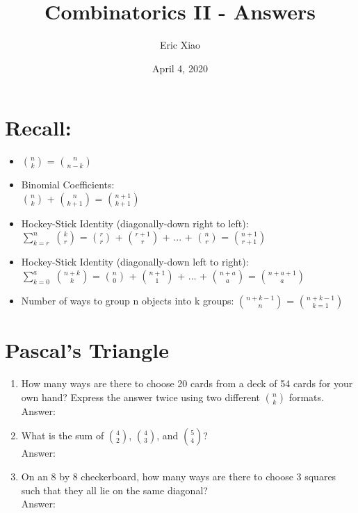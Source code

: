 \documentclass[12pt]{extarticle}
\title{Combinatorics II - Answers}
\author{Eric Xiao}
\date{April 4, 2020}
\begin{document}
\maketitle

\section{Recall:}
\begin{itemize}
    \itemsep 1.0em
    \item {$\binom{n}{k}$ = $\binom{n}{n-k}$}
    \item {Binomial Coefficients:\\$\binom{n}{k}$ + $\binom{n}{k+1}$ = $\binom{n+1}{k+1}$}
    \item {Hockey-Stick Identity (diagonally-down right to left):\\$\displaystyle\sum_{k=r}^{n}$ $\binom{k}{r}$ = $\binom{r}{r}$ + $\binom{r+1}{r}$ + ... + $\binom{n}{r}$ = $\binom{n+1}{r+1}$}
    \item {Hockey-Stick Identity (diagonally-down left to right):\\$\displaystyle\sum_{k=0}^{a}$ $\binom{n+k}{k}$ = $\binom{n}{0}$ + $\binom{n+1}{1}$ + ... + $\binom{n+a}{a}$ = $\binom{n+a+1}{a}$}
    \item {Number of ways to group n objects into k groups: $\binom{n+k-1}{n}$ = $\binom{n+k-1}{k=1}$}
\end{itemize}

\section{Pascal's Triangle}
\begin{enumerate}
    \itemsep 1.5em
    \item {How many ways are there to choose 20 cards from a deck of 54 cards for your own hand? Express the answer twice using two different $\binom{n}{k}$ formats. \\Answer: }
    \item {What is the sum of $\binom{4}{2}$, $\binom{4}{3}$, and $\binom{5}{4}$? \\Answer: }
    \item {On an 8 by 8 checkerboard, how many ways are there to choose 3 squares such that they all lie on the same diagonal? \\Answer: }
\end{enumerate}
\end{document}
